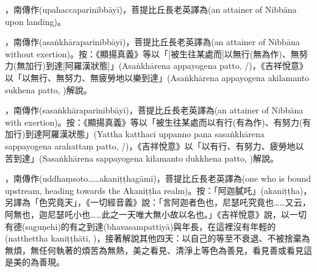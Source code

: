 \startitemgroup[noteitems]
\item{}，南傳作(upahaccaparinibbāyī)，菩提比丘長老英譯為(an attainer of Nibbāna upon landing)。
\stopitemgroup

\startitemgroup[noteitems]
\item{}，南傳作(asaṅkhāraparinibbāyī)，菩提比丘長老英譯為(an attainer of Nibbāna without exertion)。按：《顯揚真義》等以「[被生往某處而]以無行(無為作)、無努力(無加行)到達[阿羅漢狀態]」(Asaṅkhārena appayogena patto, /)，《吉祥悅意》以「以無行、無努力、無疲勞地以樂到達」(Asaṅkhārena appayogena akilamanto sukhena patto, )解說。
\stopitemgroup

\startitemgroup[noteitems]
\item{}，南傳作(sasaṅkhāraparinibbāyī)，菩提比丘長老英譯為(an attainer of Nibbāna with exertion)。按：《顯揚真義》等以「被生往某處而以有行(有為作)、有努力(有加行)到達阿羅漢狀態」(Yattha katthaci uppanno pana sasaṅkhārena sappayogena arahattaṃ patto, /)，《吉祥悅意》以「以有行、有努力、疲勞地以苦到達」(Sasaṅkhārena sappayogena kilamanto dukkhena patto, )解說。
\stopitemgroup

\startitemgroup[noteitems]
\item{}，南傳作(uddhaṃsoto……akaniṭṭhagāmī)，菩提比丘長老英譯為(one who is bound upstream, heading towards the Akaniṭṭha realm)。按：「阿迦膩吒」(akaniṭṭha)，另譯為「色究竟天」，《一切經音義》說：「言阿迦者色也，尼瑟吒究竟也……又云，阿無也，迦尼瑟吒小也……此之一天唯大無小故以名也。」《吉祥悅意》說，以一切有德(saguṇehi)的有之到達(bhavasampattiyā)與年長，在這裡沒有年輕的(natthettha kaniṭṭhāti, )，接著解說其他四天：以自己的等至不衰退、不被捨棄為無煩，無任何執著的煩苦為無熱，美之看見、清淨上等色為善見，看見善或看見這是美的為善現。
\stopitemgroup

